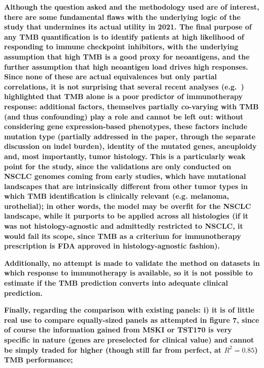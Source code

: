 \documentclass[12pt]{article}
\begin{document}
\textbf{Although the question asked and the methodology used are of interest, there are some fundamental flaws with the underlying logic of the study that undermines its actual utility in 2021. The final purpose of any TMB quantification is to identify patients at high likelihood of responding to immune checkpoint inhibitors, with the underlying assumption that high TMB is a good proxy for neoantigens, and the further assumption that high neoantigen load drives high responses. Since none of these are actual equivalences but only partial correlations, it is not surprising that several recent analyses (e.g.~\citet{litchfield2021meta}) highlighted that TMB alone is a poor predictor of immunotherapy response: additional factors, themselves partially co-varying with TMB (and thus confounding) play a role and cannot be left out: without considering gene expression-based phenotypes, these factors include mutation type (partially addressed in the paper, through the separate discussion on indel
burden), identity of the mutated genes, aneuploidy and, most importantly, tumor histology. This is a particularly weak point for the study, since the validations are only conducted on NSCLC genomes coming from early studies, which have mutational landscapes that are intrinsically different from other tumor types in which TMB identification is clinically relevant (e.g. melanoma, urothelial); in other words, the model may be overfit for the NSCLC landscape, while it purports to be applied across all histologies (if it was not histology-agnostic and admittedly restricted to NSCLC, it would fail its scope, since TMB as a criterium for immunotherapy prescription is FDA approved in histology-agnostic fashion).}



\textbf{Additionally, no attempt is made to validate the method on datasets in which response to immunotherapy is available, so it is not possible to estimate if the TMB prediction converts into adequate clinical prediction.}


\textbf{Finally, regarding the comparison with existing panels: 
i) it is of little real use to compare equally-sized panels as attempted in figure 7, since of course the information gained from MSKI or TST170 is very specific in nature (genes are preselected for clinical value) and cannot be simply traded for higher (though still far from perfect, at $R^2=0.85$) TMB performance;}
\end{document}
